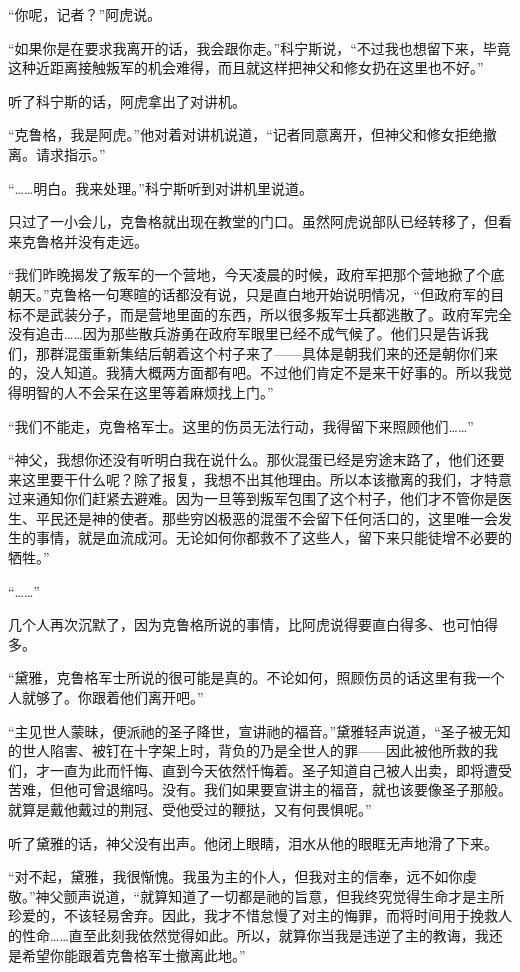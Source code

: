 “你呢，记者？”阿虎说。

“如果你是在要求我离开的话，我会跟你走。”科宁斯说，“不过我也想留下来，毕竟这种近距离接触叛军的机会难得，而且就这样把神父和修女扔在这里也不好。”

听了科宁斯的话，阿虎拿出了对讲机。

“克鲁格，我是阿虎。”他对着对讲机说道，“记者同意离开，但神父和修女拒绝撤离。请求指示。”

“……明白。我来处理。”科宁斯听到对讲机里说道。

只过了一小会儿，克鲁格就出现在教堂的门口。虽然阿虎说部队已经转移了，但看来克鲁格并没有走远。

“我们昨晚揭发了叛军的一个营地，今天凌晨的时候，政府军把那个营地掀了个底朝天。”克鲁格一句寒暄的话都没有说，只是直白地开始说明情况，“但政府军的目标不是武装分子，而是营地里面的东西，所以很多叛军士兵都逃散了。政府军完全没有追击……因为那些散兵游勇在政府军眼里已经不成气候了。他们只是告诉我们，那群混蛋重新集结后朝着这个村子来了——具体是朝我们来的还是朝你们来的，没人知道。我猜大概两方面都有吧。不过他们肯定不是来干好事的。所以我觉得明智的人不会呆在这里等着麻烦找上门。”

“我们不能走，克鲁格军士。这里的伤员无法行动，我得留下来照顾他们……”

“神父，我想你还没有听明白我在说什么。那伙混蛋已经是穷途末路了，他们还要来这里要干什么呢？除了报复，我想不出其他理由。所以本该撤离的我们，才特意过来通知你们赶紧去避难。因为一旦等到叛军包围了这个村子，他们才不管你是医生、平民还是神的使者。那些穷凶极恶的混蛋不会留下任何活口的，这里唯一会发生的事情，就是血流成河。无论如何你都救不了这些人，留下来只能徒增不必要的牺牲。”

“……”

几个人再次沉默了，因为克鲁格所说的事情，比阿虎说得要直白得多、也可怕得多。

“黛雅，克鲁格军士所说的很可能是真的。不论如何，照顾伤员的话这里有我一个人就够了。你跟着他们离开吧。”

“主见世人蒙昧，便派祂的圣子降世，宣讲祂的福音。”黛雅轻声说道，“圣子被无知的世人陷害、被钉在十字架上时，背负的乃是全世人的罪——因此被他所救的我们，才一直为此而忏悔、直到今天依然忏悔着。圣子知道自己被人出卖，即将遭受苦难，但他可曾退缩吗。没有。我们如果要宣讲主的福音，就也该要像圣子那般。就算是戴他戴过的荆冠、受他受过的鞭挞，又有何畏惧呢。”

听了黛雅的话，神父没有出声。他闭上眼睛，泪水从他的眼眶无声地滑了下来。

“对不起，黛雅，我很惭愧。我虽为主的仆人，但我对主的信奉，远不如你虔敬。”神父颤声说道，“就算知道了一切都是祂的旨意，但我终究觉得生命才是主所珍爱的，不该轻易舍弃。因此，我才不惜怠慢了对主的悔罪，而将时间用于挽救人的性命……直至此刻我依然觉得如此。所以，就算你当我是违逆了主的教诲，我还是希望你能跟着克鲁格军士撤离此地。”

